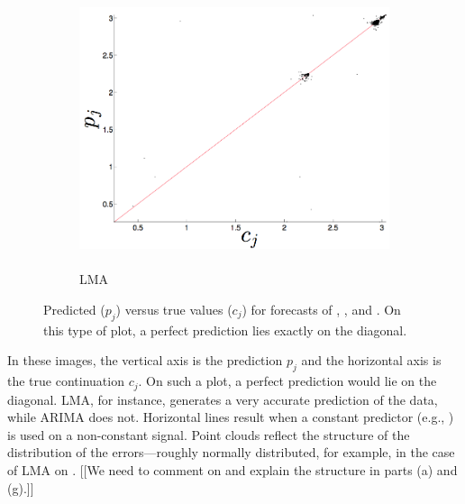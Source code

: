 \begin{figure}[htbp]
\begin{subfigure}{0.6\columnwidth}
    \includegraphics[width=\columnwidth]{figs/svdfiveLMAForecast.png}
    \caption{\svdfive \\ LMA}
    \label{fig:gccLMA}
  \end{subfigure}
   \caption{Predicted ($p_j$) versus true values ($c_j$) for
     forecasts of \col, \gcc, and \svdfive.  On this type of plot, a
     perfect prediction lies exactly on the diagonal.
%
%
}
\label{fig:forecast-example}
\end{figure} 
In these images, the vertical axis is the prediction $p_j$ and the
horizontal axis is the true continuation $c_j$.  On such a plot, a
perfect prediction would lie on the diagonal.  LMA, for instance,
generates a very accurate prediction of the \col data, while ARIMA
does not.  Horizontal lines result when a constant predictor (e.g.,
\naive) is used on a non-constant signal.  Point clouds reflect the
structure of the distribution of the errors---roughly normally
distributed, for example, in the case of LMA on \gcc.
{\color{red} [[We need to comment on and explain the structure in parts
      (a) and (g).]]}


